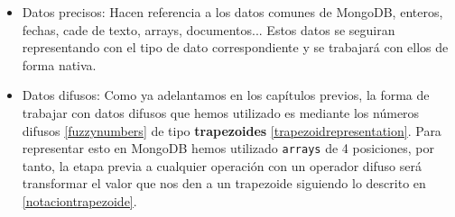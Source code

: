 \begin{itemize}
    \item Datos precisos: Hacen referencia a los datos comunes de MongoDB, enteros, fechas, cade de texto, arrays, documentos... Estos datos se seguiran representando con el tipo de dato correspondiente y se trabajará con ellos de forma nativa.
    \item Datos difusos: Como ya adelantamos en los capítulos previos, la forma de trabajar con datos difusos que hemos utilizado es mediante los números difusos \ref{fuzzynumbers} de tipo \textbf{trapezoides} \ref{trapezoidrepresentation}. Para representar esto en MongoDB hemos utilizado \texttt{arrays} de 4 posiciones, por tanto, la etapa previa a cualquier operación con un operador difuso será transformar el valor que nos den a un trapezoide siguiendo lo descrito en \ref{notaciontrapezoide}.
\end{itemize}

